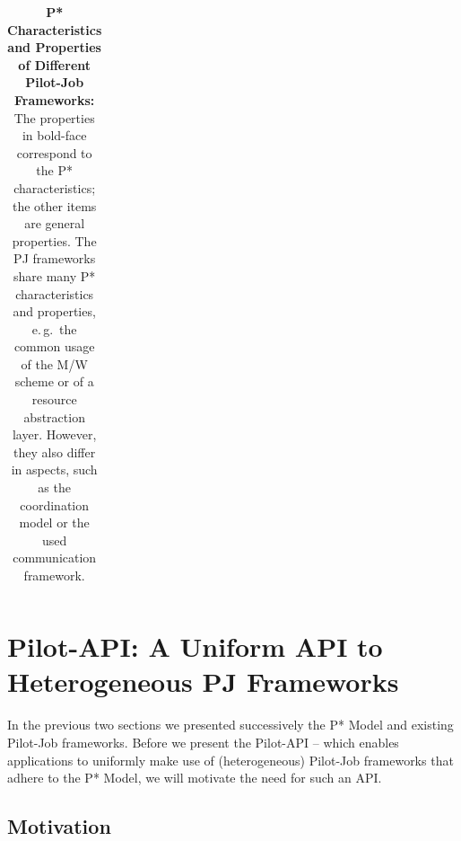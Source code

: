 \documentclass[conference,final]{IEEEtran}
\newcommand{\terminology}[1]{ {\textcolor{red} {(Terminology used: \textbf{#1}) }}}
\newcommand{\jhanote}[1]{ {\textcolor{red} { ***shantenu: #1 }}}
\newcommand{\alnote}[1]{ {\textcolor{blue} { ***andreL: #1 }}}
\newcommand{\terminology}[1]{}
\newcommand{\alnote}[1]{}
\newcommand{\jhanote}[1]{}
\newcommand{\cu}{CU\xspace}
\newcommand{\upp}{\vspace*{-0.5em}}
\begin{document}
\begin{table}[t]
\begin{tabular}{|l|p{2.5cm}|p{2.5cm}|p{2.5cm}|p{2.5cm}|}
	
\end{tabular}
\caption{\textbf{P* Characteristics and Properties of Different Pilot-Job 
Frameworks:} The properties
in bold-face correspond to the P* characteristics; the other items are general 
properties. The PJ frameworks share many P* characteristics and 
properties, e.\,g.\ the common usage of the M/W scheme or of a 
resource abstraction layer. However, they also differ in aspects, such as  
the coordination model or the used communication framework. 
\upp\upp}
\label{table:pilot-job-comparison}
\end{table}

\upp

%
%


\section{Pilot-API: A Uniform API to Heterogeneous PJ Frameworks}
\label{sec:pilot-api}


In the previous two sections we presented successively the P* Model
and existing Pilot-Job frameworks. Before we present the Pilot-API --
which enables applications to uniformly make use of (heterogeneous)
Pilot-Job frameworks that adhere to the P* Model, we will motivate the
need for such an API.

\subsection{Motivation} 


\end{document}
